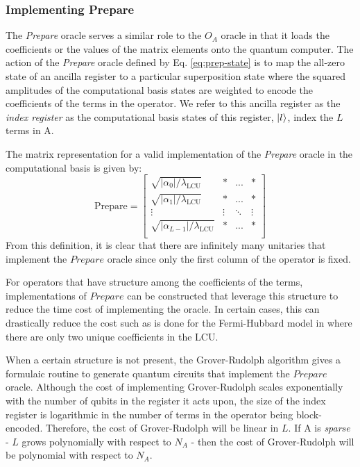 \subsubsection{Implementing \textbf{Prepare}}

The \textit{Prepare} oracle serves a similar role to the $O_A$ oracle in that it loads the coefficients or the values of the matrix elements onto the quantum computer.
The action of the \textit{Prepare} oracle defined by Eq. \ref{eq:prep-state} is to map the all-zero state of an ancilla register to a particular superposition state where the squared amplitudes of the computational basis states are weighted to encode the coefficients of the terms in the operator.
We refer to this ancilla register as the \textit{index register} as the computational basis states of this register, $\ket{l}$, index the $L$ terms in A.

The matrix representation for a valid implementation of the \textit{Prepare} oracle in the computational basis is given by:
\begin{equation}
    \text{Prepare} = \begin{bmatrix}
        \sqrt{|\alpha_0| / \lambda_\text{LCU}} & * & ... & * \\
        \sqrt{|\alpha_1| / \lambda_\text{LCU}} & * & ... & * \\
        \vdots & \vdots & \ddots & \vdots \\
        \sqrt{|\alpha_{L-1} |/ \lambda_\text{LCU}} & * & ... & * \\
    \end{bmatrix}
\end{equation}
From this definition, it is clear that there are infinitely many unitaries that implement the $\textit{Prepare}$ oracle since only the first column of the operator is fixed.

For operators that have structure among the coefficients of the terms, implementations of $\textit{Prepare}$ can be constructed that leverage this structure to reduce the time cost of implementing the oracle.
In certain cases, this can drastically reduce the cost such as is done for the Fermi-Hubbard model in \cite{babbush2018encoding} where there are only two unique coefficients in the LCU.

When a certain structure is not present, the Grover-Rudolph algorithm \cite{grover2002creating} gives a formulaic routine to generate quantum circuits that implement the $\textit{Prepare}$ oracle.
Although the cost of implementing Grover-Rudolph scales exponentially with the number of qubits in the register it acts upon, the size of the index register is logarithmic in the number of terms in the operator being block-encoded.
Therefore, the cost of Grover-Rudolph will be linear in $L$.
If A is \textit{sparse} - $L$ grows polynomially with respect to $N_A$ - then the cost of Grover-Rudolph will be polynomial with respect to $N_A$.  

